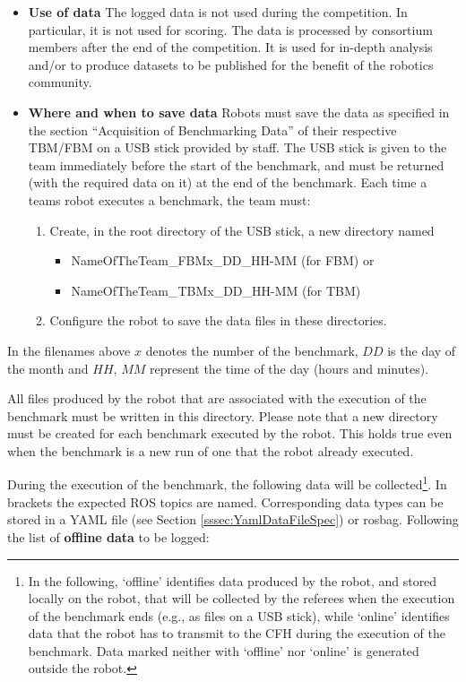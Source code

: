 \begin{description}
\begin{itemize}
\item{\textbf{Use of data}}
The logged data is not used during the competition. In particular, it is not used for scoring. The data is processed by \erl consortium members after the end of the competition. It is used for in-depth analysis and/or to produce datasets to be published for the benefit of the robotics community.

\item{\textbf{Where and when to save data}}
Robots must save the data as specified in the section ``Acquisition of Benchmarking Data'' of their respective TBM/FBM on a USB stick provided by \erlir staff. The USB stick is given to the team immediately before the start of the benchmark, and must be returned (with the required data on it) at the end of the benchmark. Each time a teams robot executes a benchmark, the team must:

\begin{enumerate}
	\item Create, in the root directory of the USB stick, a new directory named
	\begin{itemize}
		\item NameOfTheTeam\_FBMx\_DD\_HH-MM (for FBM) or
		\item NameOfTheTeam\_TBMx\_DD\_HH-MM (for TBM)
	\end{itemize}
	\item Configure the robot to save the data files in these directories.
\end{enumerate}

\end{itemize}

In the filenames above $x$ denotes the number of the benchmark, $DD$ is the day of the month and $HH$, $MM$ represent the time of the day (hours and minutes).

All files produced by the robot that are associated with the execution of the benchmark must be written in this directory. Please note that a new directory must be created for each benchmark executed by the robot. This holds true even when the benchmark is a new run of one that the robot already executed.

During the execution of the benchmark, the following data will be collected\footnote{In the following, `offline' identifies data produced by the robot, and stored locally on the robot, that will be collected by the referees when the execution of the benchmark ends (e.g., as files on a USB stick), while `online' identifies data that the robot has to transmit to the CFH during the execution of the benchmark. Data marked neither with `offline' nor `online' is generated outside the robot.}. In brackets the expected ROS topics are named. Corresponding data types can be stored in a YAML file (see Section \ref{sssec:YamlDataFileSpec}) or rosbag. Following the list of \textbf{offline data} to be logged:


\end{description}
